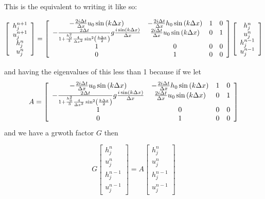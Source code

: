 \documentclass[12pt]{article}
\begin{document}
This is the equivalent to writing it like so:

\begin{multline}
\left[\begin{array}{c}
h^{n+1}_j \\
u^{n+1}_j\\
h^n_j \\
u^n_j
\end{array} \right] = \left[\begin{array}{c c c c}
-\frac{2i\Delta t}{\Delta x}u_0 \sin\left(k \Delta x\right) & -\frac{2i\Delta t}{\Delta x}h_0\sin\left(k \Delta x\right) & 1 & 0 \\
-\frac{2 \Delta t}{1 +\frac{h_0^2}{3}\frac{4}{\Delta x^2}\sin^2\left(\frac{k\Delta x}{2}\right) }g\frac{i \sin\left(k \Delta x\right)}{\Delta x} & \frac{2i\Delta t}{\Delta x}u_0\sin\left(k \Delta x\right)&0 & 1 \\
1&0&0&0\\
0&1&0&0
\end{array} \right]  \left[\begin{array}{c}
h^{n}_j \\
u^{n}_j\\
h^{n-1}_j \\
u^{n-1}_j
\end{array} \right] 
\end{multline}

and having the eigenvalues of this less than 1 because if we let $$A = \left[\begin{array}{c c c c}
-\frac{2i\Delta t}{\Delta x}u_0 \sin\left(k \Delta x\right) & -\frac{2i\Delta t}{\Delta x}h_0\sin\left(k \Delta x\right) & 1 & 0 \\
-\frac{2 \Delta t}{1 +\frac{h_0^2}{3}\frac{4}{\Delta x^2}\sin^2\left(\frac{k\Delta x}{2}\right) }g\frac{i \sin\left(k \Delta x\right)}{\Delta x} & \frac{2i\Delta t}{\Delta x}u_0\sin\left(k \Delta x\right)&0 & 1 \\
1&0&0&0\\
0&1&0&0
\end{array} \right] $$
and we have a grwoth factor $G$ then

\[
G\left[\begin{array}{c}
h^{n}_j \\
u^{n}_j\\
h^{n-1}_j \\
u^{n-1}_j
\end{array} \right] = A  \left[\begin{array}{c}
h^{n}_j \\
u^{n}_j\\
h^{n-1}_j \\
u^{n-1}_j
\end{array} \right] 
\]
\end{document}

